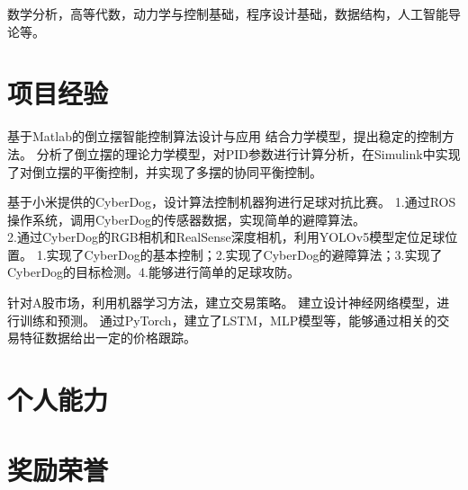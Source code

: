 \documentclass{resume}
\begin{document}
\qquad \qquad 数学分析，高等代数，动力学与控制基础，程序设计基础，数据结构，人工智能导论等。

\section{项目经验}
\Content
{基于Matlab的倒立摆智能控制算法设计与应用}
{结合力学模型，提出稳定的控制方法。}
{分析了倒立摆的理论力学模型，对PID参数进行计算分析，在Simulink中实现了对倒立摆的平衡控制，并实现了多摆的协同平衡控制。}

\Content
{基于小米提供的CyberDog，设计算法控制机器狗进行足球对抗比赛。}
{1.通过ROS操作系统，调用CyberDog的传感器数据，实现简单的避障算法。\\
2.通过CyberDog的RGB相机和RealSense深度相机，利用YOLOv5模型定位足球位置。}
{1.实现了CyberDog的基本控制；2.实现了CyberDog的避障算法；3.实现了CyberDog的目标检测。4.能够进行简单的足球攻防。}

\Content
{针对A股市场，利用机器学习方法，建立交易策略。}
{建立设计神经网络模型，进行训练和预测。}
{通过PyTorch，建立了LSTM，MLP模型等，能够通过相关的交易特征数据给出一定的价格跟踪。}

\section{个人能力}

\section{奖励荣誉}
\end{document}
